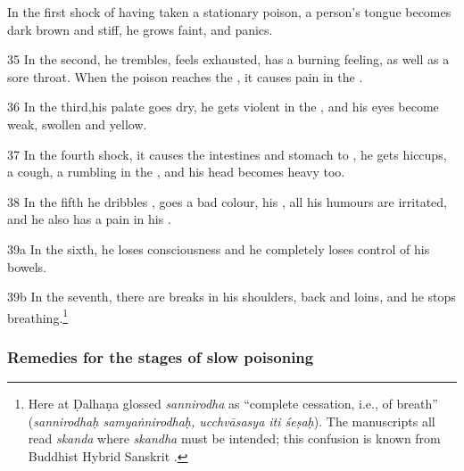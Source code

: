 \begin{translation}
    In the first shock of having taken a stationary poison, a person's tongue becomes dark brown and stiff, he grows faint, and panics.
    
    
    
    \item[35]
    In the second, he trembles, feels exhausted, has a burning feeling, as well as a
    sore throat.  When the poison reaches the , it causes
    pain in the .
    
    
    
    \item[36]
    In the third,his palate goes dry, he gets violent  in the 
    , and his eyes become weak, swollen and yellow.

    \item[37]
    In the fourth shock, it causes the intestines and stomach to
    , he gets hiccups, a cough,  a rumbling in the
    , and his head becomes heavy too.
    
     \item[38]
    In the fifth he dribbles , goes a bad colour,
    his ,  all his humours are irritated, and he
    also has a pain in his .
   
   
    \item[39a]
    In the sixth, he loses consciousness and he completely loses
    control of his bowels.
    
    \item[39b]
    In the seventh, there are breaks in his shoulders, back and loins, and he  
stops breathing.\footnote{%
Here at  Ḍalhaṇa glossed \emph{sannirodha} as
“complete cessation, i.e., of breath” (\emph{sannirodhaḥ 
samyaṅnirodhaḥ, ucchvāsasya iti śeṣaḥ}).
The manuscripts all read \emph{skanda} where \emph{skandha} must be 
intended; this confusion is known from Buddhist Hybrid Sanskrit 
\citep[608]{edge-1953}.}
    
    
    \subsubsection{Remedies for the stages of slow poisoning}
  

\end{translation}
